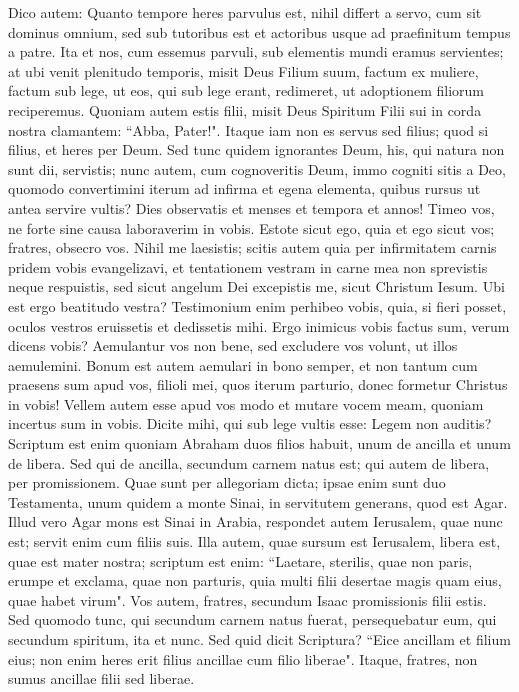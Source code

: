 \begin{biblechapter} 
\verse Dico autem: Quanto tempore heres parvulus est, nihil differt a servo, cum sit dominus omnium, 
\verse sed sub tutoribus est et actoribus usque ad praefinitum tempus a patre. 
\verse Ita et nos, cum essemus parvuli, sub elementis mundi eramus servientes; 
\verse at ubi venit plenitudo temporis, misit Deus Filium suum, factum ex muliere, factum sub lege, 
\verse ut eos, qui sub lege erant, redimeret, ut adoptionem filiorum reciperemus. 
\verse Quoniam autem estis filii, misit Deus Spiritum Filii sui in corda nostra clamantem: “Abba, Pater!". 
\verse Itaque iam non es servus sed filius; quod si filius, et heres per Deum. 
\verse Sed tunc quidem ignorantes Deum, his, qui natura non sunt dii, servistis;  
\verse nunc autem, cum cognoveritis Deum, immo cogniti sitis a Deo, quomodo convertimini iterum ad infirma et egena elementa, quibus rursus ut antea servire vultis? 
\verse Dies observatis et menses et tempora et annos! 
\verse Timeo vos, ne forte sine causa laboraverim in vobis. 
\verse Estote sicut ego, quia et ego sicut vos; fratres, obsecro vos. Nihil me laesistis; 
\verse scitis autem quia per infirmitatem carnis pridem vobis evangelizavi, 
\verse et tentationem vestram in carne mea non sprevistis neque respuistis, sed sicut angelum Dei excepistis me, sicut Christum Iesum. 
\verse Ubi est ergo beatitudo vestra? Testimonium enim perhibeo vobis, quia, si fieri posset, oculos vestros eruissetis et dedissetis mihi. 
\verse Ergo inimicus vobis factus sum, verum dicens vobis? 
\verse Aemulantur vos non bene, sed excludere vos volunt, ut illos aemulemini. 
\verse Bonum est autem aemulari in bono semper, et non tantum cum praesens sum apud vos, 
\verse filioli mei, quos iterum parturio, donec formetur Christus in vobis! 
\verse Vellem autem esse apud vos modo et mutare vocem meam, quoniam incertus sum in vobis. 
\verse Dicite mihi, qui sub lege vultis esse: Legem non auditis? 
\verse Scriptum est enim quoniam Abraham duos filios habuit, unum de ancilla et unum de libera.  
\verse Sed qui de ancilla, secundum carnem natus est; qui autem de libera, per promissionem. 
\verse Quae sunt per allegoriam dicta; ipsae enim sunt duo Testamenta, unum quidem a monte Sinai, in servitutem generans, quod est Agar.  
\verse Illud vero Agar mons est Sinai in Arabia, respondet autem Ierusalem, quae nunc est; servit enim cum filiis suis. 
\verse Illa autem, quae sursum est Ierusalem, libera est, quae est mater nostra; 
\verse scriptum est enim: “Laetare, sterilis, quae non paris, erumpe et exclama, quae non parturis, quia multi filii desertae magis quam eius, quae habet virum". 
\verse Vos autem, fratres, secundum Isaac promissionis filii estis. 
\verse Sed quomodo tunc, qui secundum carnem natus fuerat, persequebatur eum, qui secundum spiritum, ita et nunc. 
\verse Sed quid dicit Scriptura? “Eice ancillam et filium eius; non enim heres erit filius ancillae cum filio liberae". 
\verse Itaque, fratres, non sumus ancillae filii sed liberae. 
\end{biblechapter}

